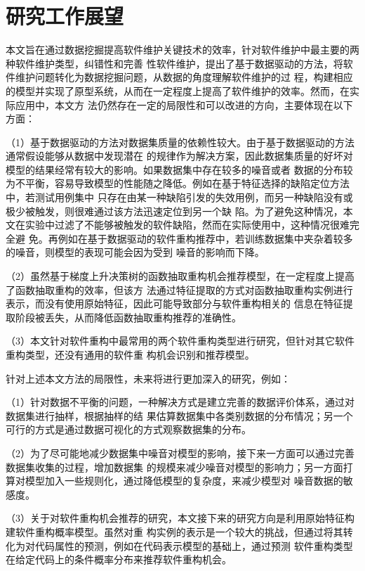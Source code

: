 \section{研究工作展望}
本文旨在通过数据挖掘提高软件维护关键技术的效率，针对软件维护中最主要的两种软件维护类型，纠错性和完善
性软件维护，提出了基于数据驱动的方法，将软件维护问题转化为数据挖掘问题，从数据的角度理解软件维护的过
程，构建相应的模型并实现了原型系统，从而在一定程度上提高了软件维护的效率。然而，在实际应用中，本文方
法仍然存在一定的局限性和可以改进的方向，主要体现在以下方面：

（1）基于数据驱动的方法对数据集质量的依赖性较大。由于基于数据驱动的方法通常假设能够从数据中发现潜在
的规律作为解决方案，因此数据集质量的好坏对模型的结果经常有较大的影响。如果数据集中存在较多的噪音或者
数据的分布较为不平衡，容易导致模型的性能随之降低。例如在基于特征选择的缺陷定位方法中，若测试用例集中
只存在由某一种缺陷引发的失效用例，而另一种缺陷没有或极少被触发，则很难通过该方法迅速定位到另一个缺
陷。为了避免这种情况，本文在实验中过滤了不能够被触发的软件缺陷，然而在实际使用中，这种情况很难完全避
免。再例如在基于数据驱动的软件重构推荐中，若训练数据集中夹杂着较多的噪音，则模型的表现可能会因为受到
噪音的影响而下降。


（2）虽然基于梯度上升决策树的函数抽取重构机会推荐模型，在一定程度上提高了函数抽取重构的效率，但该方
法通过特征提取的方式对函数抽取重构实例进行表示，而没有使用原始特征，因此可能导致部分与软件重构相关的
信息在特征提取阶段被丢失，从而降低函数抽取重构推荐的准确性。

（3）本文针对软件重构中最常用的两个软件重构类型进行研究，但针对其它软件重构类型，还没有通用的软件重
构机会识别和推荐模型。

针对上述本文方法的局限性，未来将进行更加深入的研究，例如：

（1）针对数据不平衡的问题，一种解决方式是建立完善的数据评价体系，通过对数据集进行抽样，根据抽样的结
果估算数据集中各类别数据的分布情况；另一个可行的方式是通过数据可视化的方式观察数据集的分布。

（2）为了尽可能地减少数据集中噪音对模型的影响，接下来一方面可以通过完善数据集收集的过程，增加数据集
的规模来减少噪音对模型的影响力；另一方面打算对模型加入一些规则化，通过降低模型的复杂度，来减少模型对
噪音数据的敏感度。

（3）关于对软件重构机会推荐的研究，本文接下来的研究方向是利用原始特征构建软件重构概率模型。虽然对重
构实例的表示是一个较大的挑战，但通过将其转化为对代码属性的预测，例如在代码表示模型的基础上，通过预测
软件重构类型在给定代码上的条件概率分布来推荐软件重构机会。

